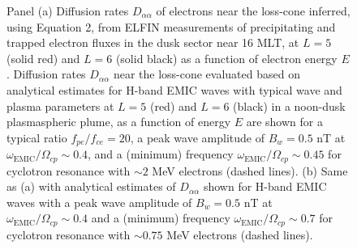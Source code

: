 \documentclass[
  letterpaper,
  DIV=11,
  numbers=noendperiod]{scrartcl}
\begin{document}
\begin{figure}


\caption{\label{fig-Daa_EMIC}Panel (a) Diffusion rates \(D_{\alpha\alpha}\) of electrons near the loss-cone inferred, using Equation 2, from ELFIN measurements of precipitating and trapped electron fluxes in the dusk sector near 16 MLT, at \(L=5\) (solid red) and \(L=6\) (solid black) as a function of electron energy \(E\). Diffusion rates \(D_{\alpha\alpha}\) near the loss-cone evaluated based on analytical estimates for H-band EMIC waves with typical wave and plasma parameters at \(L=5\) (red) and \(L=6\) (black) in a noon-dusk plasmaspheric plume, as a function of energy \(E\) are shown for a typical ratio \(f_{pe}/f_{ce}=20\), a peak wave amplitude of \(B_w=0.5\) nT at \(\omega_{\text{EMIC}}/\Omega_{cp}\sim 0.4\), and a (minimum) frequency \(\omega_{\text{EMIC}}/\Omega_{cp}\sim 0.45\) for cyclotron resonance with \(\sim2\) MeV electrons (dashed lines). (b) Same as (a) with analytical estimates of \(D_{\alpha\alpha}\) shown for H-band EMIC waves with a peak wave amplitude of \(B_w=0.5\) nT at \(\omega_{\text{EMIC}}/\Omega_{cp}\sim 0.4\) and a (minimum) frequency \(\omega_{\text{EMIC}}/\Omega_{cp}\sim 0.7\) for cyclotron resonance with \(\sim0.75\) MeV electrons (dashed lines).}

\end{figure}%

\newpage{}





\end{document}
